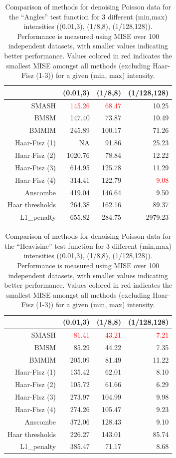 \documentclass[12pt]{article}
\begin{document}
\begin{table}[ht]
\centering
\begin{tabular}{rrrr}
  \hline
 & (0.01,3) & (1/8,8) & (1/128,128) \\ 
  \hline
SMASH & \textcolor{red}{145.26} & \textcolor{red}{68.47} & 10.25 \\ 
  BMSM & 147.40 & 73.87 & 10.49 \\ 
  BMMIM & 245.89 & 100.17 & 71.26 \\ 
	Haar-Fisz (1) & NA & 91.86 & 25.23 \\
	Haar-Fisz (2) & 1020.76 & 78.84 & 12.22 \\
	Haar-Fisz (3) & 614.95 & 125.78 & 11.29 \\	
  Haar-Fisz (4) & 314.41 & 122.79 & \textcolor{red}{9.08} \\ 
  Anscombe & 419.04 & 146.64 & 9.50 \\ 
  Haar thresholds & 264.38 & 162.16 & 89.37 \\ 
  L1\_penalty & 655.82 & 284.75 & 2979.23 \\ 
   \hline
\end{tabular}
\caption{Comparison of methods for denoising Poisson data for the ``Angles'' test function for 3 different (min,max) intensities ((0.01,3), (1/8,8), (1/128,128)). Performance is measured using MISE over 100 independent datasets, with smaller values indicating better performance. Values colored in red indicates the smallest MISE amongst all methods (excluding Haar-Fisz (1-3)) for a given (min, max) intensity.} 
\label{table:pois_ang}
\end{table}

\begin{table}[ht]
\centering
\begin{tabular}{rrrr}
  \hline
 & (0.01,3) & (1/8,8) & (1/128,128) \\ 
  \hline
SMASH & \textcolor{red}{81.41} & \textcolor{red}{43.21} & \textcolor{red}{7.21} \\ 
  BMSM & 85.29 & 44.22 & 7.35 \\ 
  BMMIM & 205.09 & 81.49 & 11.22 \\ 
	Haar-Fisz (1) & 135.42 & 62.01 & 8.10 \\
	Haar-Fisz (2) & 105.72 & 61.66 & 6.29 \\
	Haar-Fisz (3) & 273.97 & 104.99 & 9.98 \\	
	Haar-Fisz (4) & 274.26 & 105.47 & 9.23 \\ 
  Anscombe & 372.06 & 128.43 & 9.10 \\ 
  Haar thresholds & 226.27 & 143.01 & 85.74 \\ 
  L1\_penalty & 385.47 & 71.17 & 8.68 \\ 
   \hline
\end{tabular}
\caption{Comparison of methods for denoising Poisson data for the ``Heavisine'' test function for 3 different (min,max) intensities ((0.01,3), (1/8,8), (1/128,128)). Performance is measured using MISE over 100 independent datasets, with smaller values indicating better performance. Values colored in red indicates the smallest MISE amongst all methods (excluding Haar-Fisz (1-3)) for a given (min, max) intensity.} 
\label{table:pois_hs}
\end{table}
\end{document}
